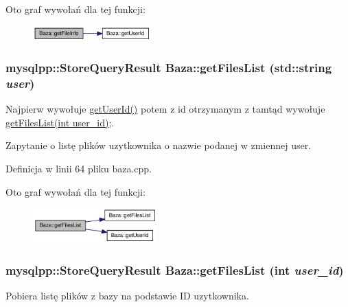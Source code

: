 Oto graf wywołań dla tej funkcji:\nopagebreak
\begin{figure}[H]
\begin{center}
\leavevmode
\includegraphics[width=129pt]{a00001_e4a033a65cb585aa91c15fd8b8fde764_cgraph}
\end{center}
\end{figure}
\hypertarget{a00001_2eace36725672b3a4ce639f91fe7d9bd}{
\subsubsection[{getFilesList}]{\setlength{\rightskip}{0pt plus 5cm}mysqlpp::StoreQueryResult Baza::getFilesList (std::string {\em user})}}
\label{a00001_2eace36725672b3a4ce639f91fe7d9bd}


Najpierw wywołuje \hyperlink{a00001_65054f08c8fd7c600f6c2fe2c7f61a43}{getUserId()} potem z id otrzymanym z tamtąd wywołuje \hyperlink{a00001_02db3388d088212bd443ee39998b5cf8}{getFilesList(int user\_\-id)};. 

Zapytanie o listę plików uzytkownika o nazwie podanej w zmiennej user. 

Definicja w linii 64 pliku baza.cpp.

Oto graf wywołań dla tej funkcji:\nopagebreak
\begin{figure}[H]
\begin{center}
\leavevmode
\includegraphics[width=136pt]{a00001_2eace36725672b3a4ce639f91fe7d9bd_cgraph}
\end{center}
\end{figure}
\hypertarget{a00001_02db3388d088212bd443ee39998b5cf8}{
\subsubsection[{getFilesList}]{\setlength{\rightskip}{0pt plus 5cm}mysqlpp::StoreQueryResult Baza::getFilesList (int {\em user\_\-id})}}
\label{a00001_02db3388d088212bd443ee39998b5cf8}


Pobiera listę plików z bazy na podstawie ID uzytkownika. 


